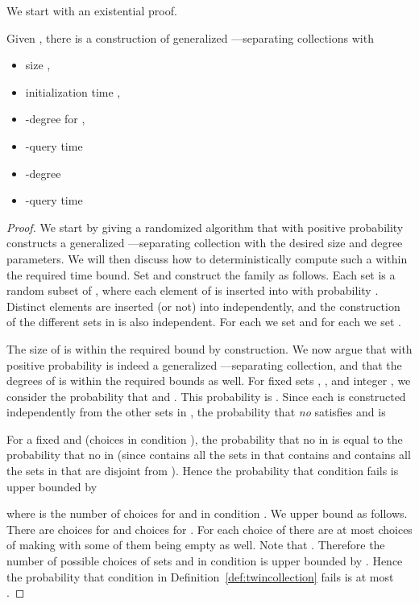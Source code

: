 We start with an existential proof. 


\begin{lemma}\label{lem:twin_sep_coll_brute_force}
Given , there is a construction of generalized ---separating collections with 
\begin{itemize}\setlength\itemsep{-.7mm}
\item size , 
\item initialization time ,
\item -degree for , 
\item -query time 
\item -degree 
\item -query time 
\end{itemize}
\end{lemma}

\begin{proof}
We start by giving a randomized algorithm that with positive probability constructs a generalized ---separating collection  with the desired size and degree parameters. 
We will then discuss how to deterministically compute such a  within the required time bound. Set  and construct the family 
 as follows. Each set  is a random subset of , where each element of  is inserted into  with probability . Distinct elements are inserted (or not) into  
independently, and the construction of the different sets in  is also independent. For each   we set  and 
for each  we set .

The size of  is within the required bound by construction. We now argue that with positive probability 
 is indeed a generalized ---separating collection, and that the degrees of  
is within the required bounds as well. For fixed sets , , and integer , we consider the probability that  and . 
This probability is . Since each  is constructed independently from the other sets in , the probability that {\em no}  satisfies  and  is

For a fixed  and  (choices in condition ), the probability that no  in  is equal to the 
probability that no  in   (since  contains all 
the sets in  that contains  and  contains all the sets in  that are disjoint from ). 
Hence the probability that condition  fails is upper bounded by 

where  is the number of choices for  and  in condition . We upper bound  as follows.
There are  choices for  and  choices for . 
For each choice of  there are at most  choices of making  with some of them being empty as well. Note that . 
Therefore the number of possible choices of sets  and  in condition  is upper bounded by . 
Hence the probability that condition  in Definition~\ref{def:twincollection} fails is at most .


\end{proof}
